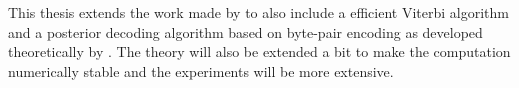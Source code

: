 This thesis extends the work made by \citet{sand2013ziphmmlib} to also include
a efficient Viterbi algorithm and a posterior decoding algorithm based
on byte-pair encoding as developed theoretically by
\citet{lifshits2009speeding}. The theory will also be extended a bit to make
the computation numerically stable and the experiments will be more extensive.

